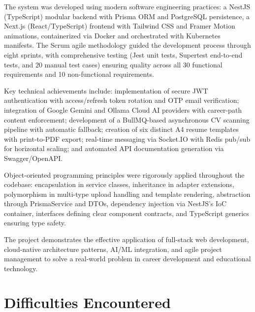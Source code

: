 \documentclass[12pt,a4paper]{report}
\begin{document}
The system was developed using modern software engineering practices: a NestJS (TypeScript) modular backend with Prisma ORM and PostgreSQL persistence, a Next.js (React/TypeScript) frontend with Tailwind CSS and Framer Motion animations, containerized via Docker and orchestrated with Kubernetes manifests. The Scrum agile methodology guided the development process through eight sprints, with comprehensive testing (Jest unit tests, Supertest end-to-end tests, and 20 manual test cases) ensuring quality across all 30 functional requirements and 10 non-functional requirements.

Key technical achievements include: implementation of secure JWT authentication with access/refresh token rotation and OTP email verification; integration of Google Gemini and Ollama Cloud AI providers with career-path content enforcement; development of a BullMQ-based asynchronous CV scanning pipeline with automatic fallback; creation of six distinct A4 resume templates with print-to-PDF export; real-time messaging via Socket.IO with Redis pub/sub for horizontal scaling; and automated API documentation generation via Swagger/OpenAPI.

Object-oriented programming principles were rigorously applied throughout the codebase: encapsulation in service classes, inheritance in adapter extensions, polymorphism in multi-type upload handling and template rendering, abstraction through PrismaService and DTOs, dependency injection via NestJS's IoC container, interfaces defining clear component contracts, and TypeScript generics ensuring type safety.

The project demonstrates the effective application of full-stack web development, cloud-native architecture patterns, AI/ML integration, and agile project management to solve a real-world problem in career development and educational technology.

\section{Difficulties Encountered}
\end{document}
